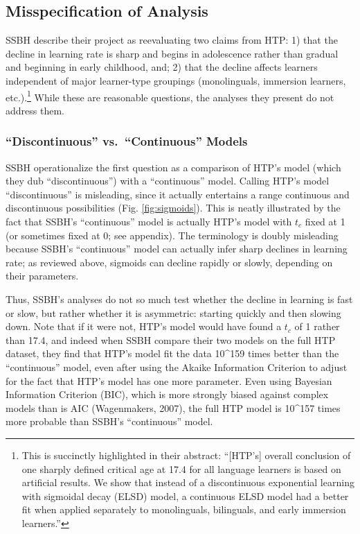 \documentclass[
  english,
  doc,floatsintext]{apa6}
\begin{document}
\hypertarget{misspecification-of-analysis}{%
\subsection{Misspecification of Analysis}\label{misspecification-of-analysis}}

SSBH describe their project as reevaluating two claims from HTP: 1) that the decline in learning rate is sharp and begins in adolescence rather than gradual and beginning in early childhood, and; 2) that the decline affects learners independent of major learner-type groupings (monolinguals, immersion learners, etc.).\footnote{This is succinctly highlighted in their abstract: ``{[}HTP's{]} overall conclusion of one sharply defined critical age at 17.4 for all language learners is based on artificial results. We show that instead of a discontinuous exponential learning with sigmoidal decay (ELSD) model, a continuous ELSD model had a better fit when applied separately to monolinguals, bilinguals, and early immersion learners.''} While these are reasonable questions, the analyses they present do not address them.

\hypertarget{discontinuous-vs.-continuous-models}{%
\subsubsection{``Discontinuous'' vs.~``Continuous'' Models}\label{discontinuous-vs.-continuous-models}}

SSBH operationalize the first question as a comparison of HTP's model (which they dub ``discontinuous'') with a ``continuous'' model. Calling HTP's model ``discontinuous'' is misleading, since it actually entertains a range continuous and discontinuous possibilities (Fig. \ref{fig:sigmoids}). This is neatly illustrated by the fact that SSBH's ``continuous'' model is actually HTP's model with \(t_c\) fixed at 1 (or sometimes fixed at 0; see appendix). The terminology is doubly misleading because SSBH's ``continuous'' model can actually infer sharp declines in learning rate; as reviewed above, sigmoids can decline rapidly or slowly, depending on their parameters.

Thus, SSBH's analyses do not so much test whether the decline in learning is fast or slow, but rather whether it is asymmetric: starting quickly and then slowing down. Note that if it were not, HTP's model would have found a \(t_c\) of 1 rather than 17.4, and indeed when SSBH compare their two models on the full HTP dataset, they find that HTP's model fit the data 10\^{}159 times better than the ``continuous'' model, even after using the Akaike Information Criterion to adjust for the fact that HTP's model has one more parameter. Even using Bayesian Information Criterion (BIC), which is more strongly biased against complex models than is AIC (Wagenmakers, 2007), the full HTP model is 10\^{}157 times more probable than SSBH's ``continuous'' model.
\end{document}
